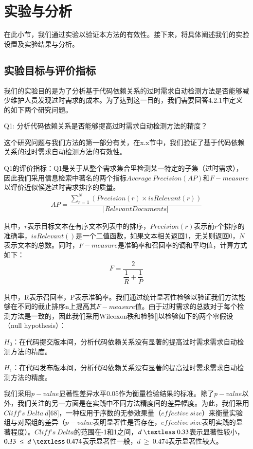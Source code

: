 \section{实验与分析}

在此小节，我们通过实验以验证本方法的有效性。接下来，将具体阐述我们的实验设置及实验结果与分析。

\subsection{实验目标与评价指标}
我们的实验目的是为了分析基于代码依赖关系的过时需求自动检测方法是否能够减少维护人员发现过时需求的成本。为了达到这一目的，我们需要回答4.2.1中定义的如下两个研究问题。

Q1: 分析代码依赖关系是否能够提高过时需求自动检测方法的精度？

这个研究问题与我们方法的第一部分有关，在x.x节中，我们验证了基于代码依赖关系的过时需求自动检测方法的有效性。

Q1的评价指标：Q1是关于从整个需求集合里检测某一特定的子集（过时需求），因此我们采用信息检索中著名的两个指标$Average \  Precision\left( AP\right)$和$F-measure$以评价近似候选过时需求排序的质量。
\begin{align}
AP=\dfrac {\sum _{r=1}^{N}\left( Precision\left( r\right) \times isRelevant\left( r\right) \right) } {\left| RelevantDocuments\right| }
\end{align}

其中，$r$表示目标文本在有序文本列表中的排序，$Precision\left( r\right)$表示前$r$个排序的准确率，$isRelevant\left(\right)$是一个二值函数，如果文本相关返回1，无关则返回0，$N$表示文本的总数。同时，$F-measure$是准确率和召回率的调和平均值，计算方式如下：
\begin{align}
F=\dfrac {2} {\dfrac {1} {R}+\dfrac {1} {P}}\end{align}

其中，R表示召回率，P表示准确率。我们通过统计显著性检验以验证我们方法能够在不同的截止排序n上提高其$F-measure$值。由于过时需求的总数对于每个检测方法是一致的，因此我们采用Wilcoxon秩和检验[]以检验如下的两个零假设（null hypothesis）：

$H_{0}$：在代码提交版本间，分析代码依赖关系没有显著的提高过时需求需求自动检测方法的精度。

$H_{1}$：在代码发布版本间，分析代码依赖关系没有显著的提高过时需求需求自动检测方法的精度。

我们采用$p-value$显著性差异水平0.05作为衡量检验结果的标准。除了$p-value$以外，我们关注的另一方面是在实践中不同方法精度间的差异幅度。为此，我们采用$Cliff’s \ Delta \ d$[68]，一种应用于序数的无参效果量（$effective \ size$）来衡量实验组与对照组的差异（$p-value$表明显著性是否存在，$effective \ size$表明实践的显著程度）。$Cliff’s \ Delta$的范围在-1和1之间，$d\ \textless \ 0.33$表示显著性较小，$0.33\ \leq \ d \ \textless \ 0.474$表示显著性一般，$d\ \geq \ 0.474$表示显著性较大。

